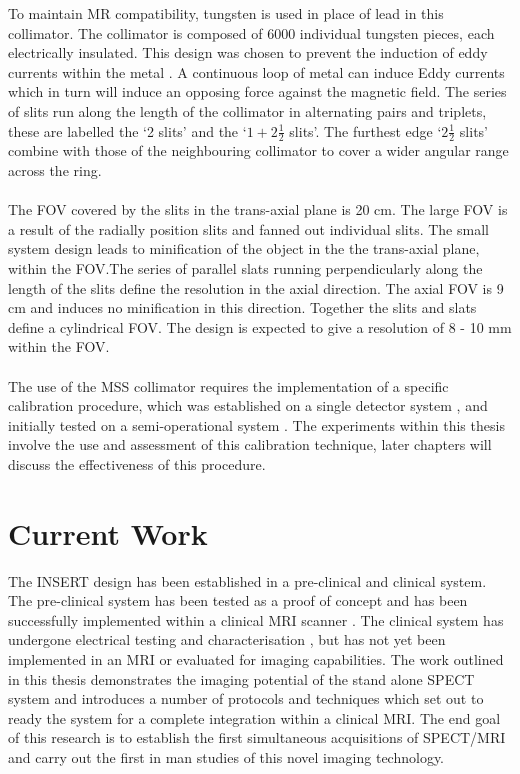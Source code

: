 To maintain \acrshort{MR} compatibility, tungsten is used in place of lead in this collimator. The collimator is composed of 6000 individual tungsten pieces, each electrically insulated. This design was chosen to prevent the induction of eddy currents within the metal \cite{7286864}. A continuous loop of metal can induce Eddy currents which in turn will induce an opposing force against the magnetic field. The series of slits run along the length of the collimator in alternating pairs and triplets, these are labelled the `2 slits' and the `$1 + 2\frac{1}{2}$ slits'. The furthest edge `$2\frac{1}{2}$ slits'  combine with those of the neighbouring collimator to cover a wider angular range across the ring. 
\paragraph{}
The \acrshort{FOV} covered by the slits in the trans-axial plane is 20 cm. The large \acrshort{FOV} is a result of the radially position slits and fanned out individual slits. The small system design leads to minification of the object in the the trans-axial plane, within the \acrshort{FOV}.The series of parallel slats running perpendicularly along the length of the slits define the resolution in the axial direction. The axial \acrshort{FOV} is 9 cm and induces no minification in this direction. Together the slits and slats define a cylindrical \acrshort{FOV}. The design is expected to give a resolution of 8 - 10 mm within the \acrshort{FOV}. 
\paragraph{}
 The use of the MSS collimator requires the implementation of a specific calibration procedure, which was established on a single detector system \cite{8340862}, and initially tested on a semi-operational system \cite{inproceedings}. The experiments within this thesis involve the use and assessment of this calibration technique, later chapters will discuss the effectiveness of this procedure.

\section{Current Work}
The \acrshort{INSERT} design has been established in a pre-clinical and clinical system. The pre-clinical system has been tested as a proof of concept and has been successfully implemented within a clinical \acrshort{MRI} scanner \cite{Carminati2018ExperimentalInsert}. The clinical system has undergone electrical testing and characterisation \cite{8432104}, but has not yet been implemented in an \acrshort{MRI} or evaluated for imaging capabilities. The work outlined in this thesis demonstrates the imaging potential of the stand alone \acrshort{SPECT} system and introduces a number of protocols and techniques which set out to ready the system for a complete integration within a clinical \acrshort{MRI}. The end goal of this research is to establish the first simultaneous acquisitions of \acrshort{SPECT/MRI} and carry out the first in man studies of this novel imaging technology. 


